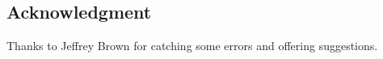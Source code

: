 \subsection*{Acknowledgment}

Thanks to Jeffrey Brown for catching some errors and offering suggestions.

\newpage
